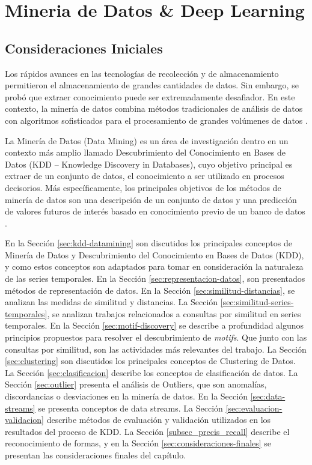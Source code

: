 \chapter{Mineria de Datos \& Deep Learning }\label{cap:deep_learning}

\section{Consideraciones Iniciales}

Los rápidos avances en las tecnologías de recolección y de almacenamiento permitieron el almacenamiento de grandes cantidades de datos. Sin embargo, se probó que extraer conocimiento puede ser extremadamente desafiador. En este contexto, la minería de datos combina métodos tradicionales de análisis de datos con algoritmos sofisticados para el procesamiento de grandes volúmenes de datos \cite{Tan:2005:IDM:1095618}.

La Minería de Datos (Data Mining) es un área de investigación dentro en un contexto más amplio llamado Descubrimiento del Conocimiento en Bases de Datos (KDD – Knowledge Discovery in Databases), cuyo objetivo principal es extraer de un conjunto de datos, el conocimiento a ser utilizado en procesos decisorios. Más específicamente, los principales objetivos de los métodos de minería de datos son una descripción de un conjunto de datos y una predicción de valores futuros de interés basado en conocimiento previo de un banco de datos \cite{Fayyad:1996:DMK:257938.257942}.

  
 En la Sección \ref{sec:kdd-datamining} son discutidos los principales conceptos de Minería de Datos y Descubrimiento del Conocimiento en Bases de Datos (KDD), y como estos conceptos son adaptados para tomar en consideración la naturaleza de las series temporales. En la Sección \ref{sec:representacion-datos}, son presentados métodos de representación de datos. En la Sección \ref{sec:similitud-distancias}, se analizan las medidas de similitud y distancias. La Sección \ref{sec:similitud-series-temporales}, se analizan trabajos relacionados a consultas por similitud en series temporales. En la Sección \ref{sec:motif-discovery} se describe a profundidad algunos principios propuestos para resolver el descubrimiento de \textit{motifs}. Que junto con las consultas por similitud, son las actividades más relevantes del trabajo. La Sección \ref{sec:clustering} son discutidos los principales conceptos de Clustering de Datos. La Sección \ref{sec:clasificacion} describe los conceptos de clasificación de datos. La Sección \ref{sec:outlier} presenta el análisis de Outliers, que son anomalías, discordancias o desviaciones en la minería de datos. En la Sección \ref{sec:data-streams} se presenta conceptos de data streams. La Sección \ref{sec:evaluacion-validacion} describe métodos de evaluación y validación utilizados en los resultados del proceso de KDD. La Sección \ref{subsec_precis_recall} describe el reconocimiento de formas, y en la Sección \ref{sec:consideraciones-finales} se presentan las consideraciones finales del capítulo.


